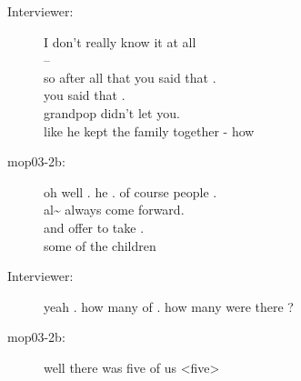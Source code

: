 \documentclass{article}
\newcommand{\turn}[2]{
\item[#1:] #2
}
\begin{document}
\begin{description}
\turn{Interviewer}{I don't really know it at all\\
--\\
so after all that you said that .\\
you said that .\\
grandpop didn't let you.\\
like he kept the family together - how}

\turn{mop03-2b}{oh well . he . of course people .\\
al\~{}  always come forward.\\
and offer to take .\\
some of the children}

\turn{Interviewer}{yeah . how many of . how many were there ?}

\turn{mop03-2b}{well there was five of us \textless five\textgreater }


\end{description}
\end{document}
